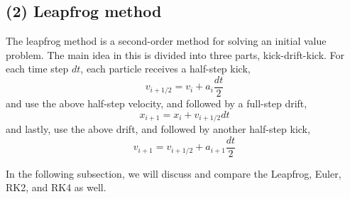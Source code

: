 \documentclass[12pt]{article}
\begin{document}
    \subsection{(2) Leapfrog method}
    The leapfrog method is a second-order method for solving an initial value problem. The main idea in this is divided into three parts, kick-drift-kick. For each time step $dt$, each particle receives a half-step kick,
    \[v_{i+1/2} = v_i + a_i\frac{dt}{2}\]
    and use the above half-step velocity, and followed by a full-step drift,
    \[x_{i+1} = x_i + v_{i+1/2}dt\]
    and lastly, use the above drift, and followed by another half-step kick,
    \[v_{i+1} = v_{i+1/2} + a_{i+1}\frac{dt}{2}\]

    In the following subsection, we will discuss and compare the Leapfrog, Euler, RK2, and RK4 as well. 
\end{document}
